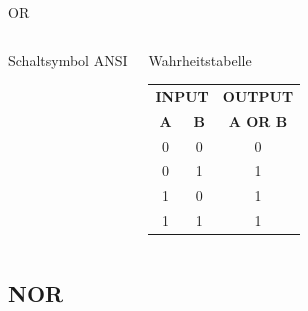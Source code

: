 \begin{frame}{OR}
\begin{columns}
    {\small Schaltsymbol ANSI}
    \begin{block}{Wahrheitstabelle}
      \begin{tabular}{cc|c}
        \multicolumn{2}{c|}{\textbf{INPUT}} & \textbf{OUTPUT} \\
        \textbf{A} & \textbf{B} & \textbf{A OR B} \\ \hline
        0 & 0 & 0 \\
        0 & 1 & 1 \\
        1 & 0 & 1 \\
        1 & 1 & 1 \\
      \end{tabular}
    \end{block}
  \end{columns}
\end{frame}

\subsection{NOR}

